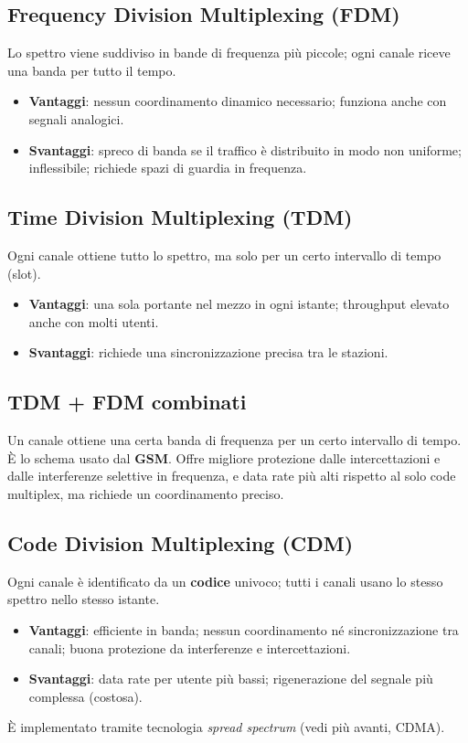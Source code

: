 
\subsection{Frequency Division Multiplexing (FDM)}
Lo spettro viene suddiviso in bande di frequenza più piccole; ogni canale riceve una banda per tutto il tempo.
\begin{itemize}
    \item \textbf{Vantaggi}: nessun coordinamento dinamico necessario; funziona anche con segnali analogici.
    \item \textbf{Svantaggi}: spreco di banda se il traffico è distribuito in modo non uniforme; inflessibile; richiede spazi di guardia in frequenza.
\end{itemize}

\subsection{Time Division Multiplexing (TDM)}
Ogni canale ottiene tutto lo spettro, ma solo per un certo intervallo di tempo (slot).
\begin{itemize}
    \item \textbf{Vantaggi}: una sola portante nel mezzo in ogni istante; throughput elevato anche con molti utenti.
    \item \textbf{Svantaggi}: richiede una sincronizzazione precisa tra le stazioni.
\end{itemize}

\subsection{TDM + FDM combinati}
Un canale ottiene una certa banda di frequenza per un certo intervallo di tempo. È lo schema usato dal \textbf{GSM}. Offre migliore protezione dalle intercettazioni e dalle interferenze selettive in frequenza, e data rate più alti rispetto al solo code multiplex, ma richiede un coordinamento preciso.

\subsection{Code Division Multiplexing (CDM)}
Ogni canale è identificato da un \textbf{codice} univoco; tutti i canali usano lo stesso spettro nello stesso istante.
\begin{itemize}
    \item \textbf{Vantaggi}: efficiente in banda; nessun coordinamento né sincronizzazione tra canali; buona protezione da interferenze e intercettazioni.
    \item \textbf{Svantaggi}: data rate per utente più bassi; rigenerazione del segnale più complessa (costosa).
\end{itemize}
È implementato tramite tecnologia \textit{spread spectrum} (vedi più avanti, CDMA).

